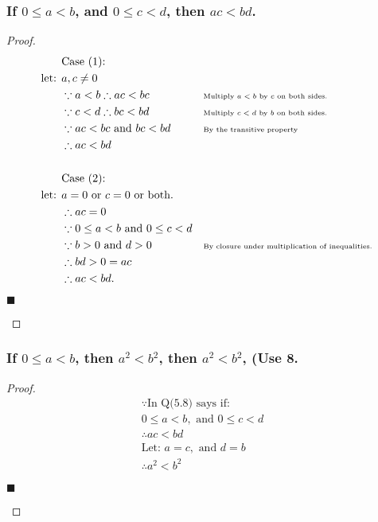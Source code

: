\documentclass[letterpaper, 10 pt, conference]{ieeeconf}  %
\begin{document}
\subsubsection{\textbf{If $0 \leq  a < b$, and $0 \leq c < d$, then $ac < bd$.}}


\begin{proof}
\begin{align}
    &\text{Case (1): } &&\\
    \text{let: } & a, c \neq 0 &&\\
    &\because a < b \therefore ac < bc && \text{\tiny{Multiply $a < b$ by $c$ on both sides.}} \\
    &\because c < d \therefore bc < bd && \text{\tiny{Multiply $c < d$ by $b$ on both sides.}} \\
    &\because ac < bc \text{ and } bc < bd && \text{\tiny{By the transitive property}} \\ 
    &\therefore ac < bd && \\\\
    &\text{Case (2): } &&\\
    \text{let: } & a = 0 \text { or } c = 0 \text{ or both. }&&\\
    &\therefore ac = 0&&\\
    &\because 0 \leq a < b \text{ and } 0 \leq c < d && \\
    &\because b > 0 \text{ and } d > 0 && \text{\tiny{By closure under multiplication of inequalities.}}\\
    &\therefore bd > 0 = ac &&\\
    &\therefore ac < bd.&&
\end{align}
\begin{flushright}
$\blacksquare$
\end{flushright}
\end{proof}

\subsubsection{\textbf{If $0 \leq a < b$, then $a^2 < b^2$, then $a^2 < b^2$, (Use 8.}}

\begin{proof}
\begin{align}
    &\because \text{In Q(5.8) says if:} && \\
    &0 \leq a < b, \text{ and } 0 \leq c < d && \\ 
    &\therefore ac < bd && \\ 
    &\text{Let: } a = c, \text{ and } d = b&&\\
    &\therefore a^2 < b^2 &&
\end{align}
\begin{flushright}
$\blacksquare$
\end{flushright}
\end{proof}
\end{document}
